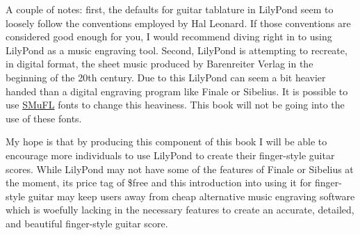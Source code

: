 \documentclass[]{memoir}
\begin{document}
A couple of notes: first, the defaults for guitar tablature in
LilyPond seem to loosely follow the conventions employed by Hal
Leonard. If those conventions are considered good enough for you, I
would recommend diving right in to using LilyPond as a music engraving
tool. Second, LilyPond is attempting to recreate, in digital format,
the sheet music produced by Barenreiter Verlag in the beginning of the
20th century. Due to this LilyPond can seem a bit heavier handed than
a digital engraving program like Finale or Sibelius. It is possible to
use \href{https://www.smufl.org/}{SMuFL} fonts to change this
heaviness. This book will not be going into the use of these fonts.

My hope is that by producing this component of this book I will be
able to encourage more individuals to use LilyPond to create their
finger-style guitar scores. While LilyPond may not have some of the
features of Finale or Sibelius at the moment, its price tag of \$free
and this introduction into using it for finger-style guitar may keep
users away from cheap alternative music engraving software which is
woefully lacking in the necessary features to create an accurate,
detailed, and beautiful finger-style guitar score.

\backmatter
\printindex
\end{document}
